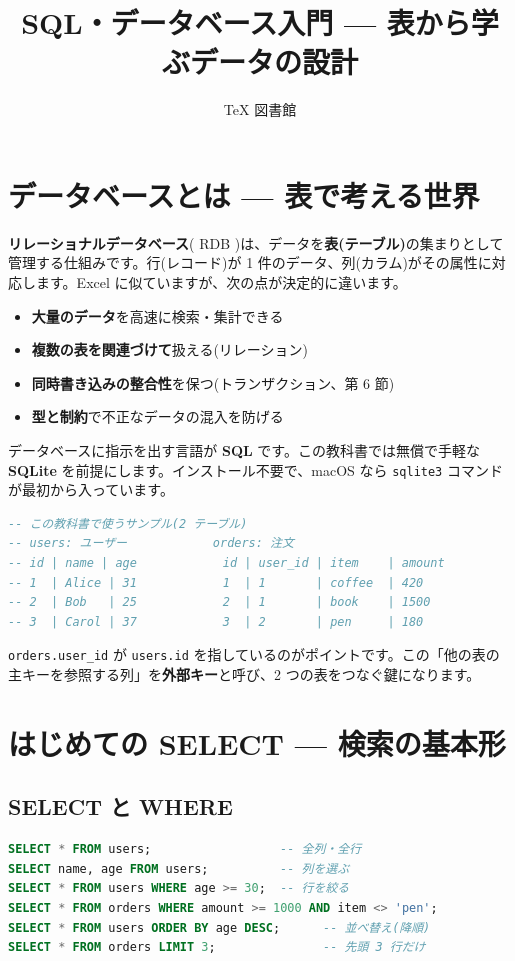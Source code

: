 \documentclass{article}
\title{SQL・データベース入門 — 表から学ぶデータの設計}
\author{TeX 図書館}
\begin{document}
\section{データベースとは — 表で考える世界}

\textbf{リレーショナルデータベース}( RDB )は、データを\textbf{表(テーブル)}の集まりとして管理する仕組みです。行(レコード)が 1 件のデータ、列(カラム)がその属性に対応します。Excel に似ていますが、次の点が決定的に違います。

\begin{itemize}
\item \textbf{大量のデータ}を高速に検索・集計できる
\item \textbf{複数の表を関連づけて}扱える(リレーション)
\item \textbf{同時書き込みの整合性}を保つ(トランザクション、第 6 節)
\item \textbf{型と制約}で不正なデータの混入を防げる
\end{itemize}

データベースに指示を出す言語が \textbf{SQL} です。この教科書では無償で手軽な \textbf{SQLite} を前提にします。インストール不要で、macOS なら \texttt{sqlite3} コマンドが最初から入っています。

\begin{lstlisting}[language=SQL]
-- この教科書で使うサンプル(2 テーブル)
-- users: ユーザー            orders: 注文
-- id | name | age            id | user_id | item    | amount
-- 1  | Alice | 31            1  | 1       | coffee  | 420
-- 2  | Bob   | 25            2  | 1       | book    | 1500
-- 3  | Carol | 37            3  | 2       | pen     | 180
\end{lstlisting}

\texttt{orders.user\_id} が \texttt{users.id} を指しているのがポイントです。この「他の表の主キーを参照する列」を\textbf{外部キー}と呼び、2 つの表をつなぐ鍵になります。

\section{はじめての SELECT — 検索の基本形}

\subsection{SELECT と WHERE}

\begin{lstlisting}[language=SQL]
SELECT * FROM users;                  -- 全列・全行
SELECT name, age FROM users;          -- 列を選ぶ
SELECT * FROM users WHERE age >= 30;  -- 行を絞る
SELECT * FROM orders WHERE amount >= 1000 AND item <> 'pen';
SELECT * FROM users ORDER BY age DESC;      -- 並べ替え(降順)
SELECT * FROM orders LIMIT 3;               -- 先頭 3 行だけ
\end{lstlisting}
\end{document}
